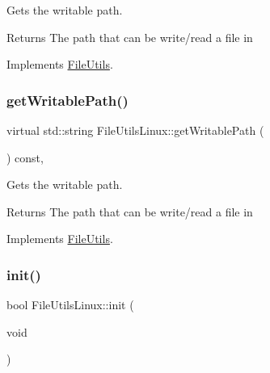 Gets the writable path. \begin{DoxyReturn}{Returns}
The path that can be write/read a file in 
\end{DoxyReturn}


Implements \hyperlink{classFileUtils_aab14c8d4e292f7a1e9b2b2908d02a0ed}{File\+Utils}.

\mbox{\label{classFileUtilsLinux_a8d7c6a6b1d749016cf44849f4842407b}} 
\subsubsection{\texorpdfstring{get\+Writable\+Path()}{getWritablePath()}\hspace{0.1cm}{\footnotesize\ttfamily [2/2]}}
{\footnotesize\ttfamily virtual std\+::string File\+Utils\+Linux\+::get\+Writable\+Path (\begin{DoxyParamCaption}{ }\end{DoxyParamCaption}) const\hspace{0.3cm}{\ttfamily [override]}, {\ttfamily [virtual]}}

Gets the writable path. \begin{DoxyReturn}{Returns}
The path that can be write/read a file in 
\end{DoxyReturn}


Implements \hyperlink{classFileUtils_aab14c8d4e292f7a1e9b2b2908d02a0ed}{File\+Utils}.

\mbox{\label{classFileUtilsLinux_a1f11f2fb2b248fe6670cf991251d2821}} 
\subsubsection{\texorpdfstring{init()}{init()}\hspace{0.1cm}{\footnotesize\ttfamily [1/2]}}
{\footnotesize\ttfamily bool File\+Utils\+Linux\+::init (\begin{DoxyParamCaption}\item[{void}]{ }\end{DoxyParamCaption})\hspace{0.3cm}{\ttfamily [virtual]}}

